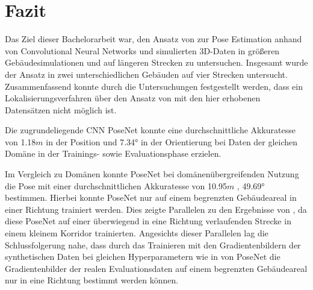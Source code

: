 
\section{Fazit}
\label{sec:kapitel_6}
Das Ziel dieser Bachelorarbeit war, den Ansatz von \citet{acharyaBIMPoseNetIndoorCamera2019} zur Pose Estimation anhand von Convolutional Neural Networks und simulierten 3D-Daten in größeren Gebäudesimulationen und auf längeren Strecken zu untersuchen.
Insgesamt wurde der Ansatz in zwei unterschiedlichen Gebäuden auf vier Strecken untersucht. Zusammenfassend konnte durch die Untersuchungen festgestellt werden, dass ein Lokalisierungsverfahren über den Ansatz von \citet{acharyaBIMPoseNetIndoorCamera2019} mit den hier erhobenen Datensätzen nicht möglich ist.


Die zugrundeliegende CNN PoseNet konnte eine durchschnittliche Akkuratesse von 1.18$m$ in der Position und 7.34° in der Orientierung bei Daten der gleichen Domäne in der Trainings- sowie Evaluationsphase erzielen.


Im Vergleich zu Domänen konnte PoseNet bei domänenübergreifenden Nutzung die Pose mit einer durchschnittlichen Akkuratesse von 10.95$m$ , 49.69° bestimmen. Hierbei konnte PoseNet nur auf einem begrenzten Gebäudeareal in einer Richtung trainiert werden. Dies zeigte Parallelen zu den Ergebnisse von \citet{acharyaBIMPoseNetIndoorCamera2019}, da diese PoseNet auf einer überwiegend in eine Richtung verlaufenden Strecke in einem kleinem Korridor trainierten. Angesichts dieser Parallelen lag die Schlussfolgerung nahe, dass durch das Trainieren mit den Gradientenbildern der synthetischen Daten bei gleichen Hyperparametern wie in \cite{acharyaBIMPoseNetIndoorCamera2019} von PoseNet die Gradientenbilder der realen Evaluationsdaten auf einem begrenzten Gebäudeareal nur in eine Richtung bestimmt werden können.


